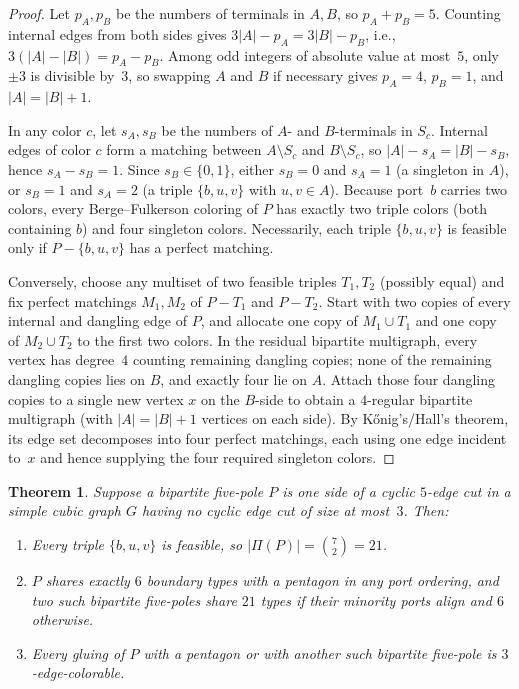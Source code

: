 \documentclass[11pt]{article}
\newtheorem{theorem}{Theorem}
\theoremstyle{remark}
\begin{document}
\begin{proof}
Let $p_A, p_B$ be the numbers of terminals in $A, B$, so $p_A + p_B = 5$. Counting
internal edges from both sides gives $3|A| - p_A = 3|B| - p_B$, i.e.,
$3(|A| - |B|) = p_A - p_B$. Among odd integers of absolute value at most~$5$, only
$\pm 3$ is divisible by~$3$, so swapping $A$ and $B$ if necessary gives $p_A = 4$,
$p_B = 1$, and $|A| = |B| + 1$.

In any color $c$, let $s_A, s_B$ be the numbers of $A$- and $B$-terminals in $S_c$.
Internal edges of color $c$ form a matching between $A \setminus S_c$ and
$B \setminus S_c$, so $|A| - s_A = |B| - s_B$, hence $s_A - s_B = 1$. Since
$s_B \in \{0,1\}$, either $s_B = 0$ and $s_A = 1$ (a singleton in $A$), or $s_B = 1$ and
$s_A = 2$ (a triple $\{b, u, v\}$ with $u, v \in A$). Because port~$b$ carries two
colors, every Berge--Fulkerson coloring of $P$ has exactly two triple colors (both
containing $b$) and four singleton colors. Necessarily, each triple $\{b, u, v\}$ is
feasible only if $P - \{b, u, v\}$ has a perfect matching.

Conversely, choose any multiset of two feasible triples $T_1, T_2$ (possibly equal) and
fix perfect matchings $M_1, M_2$ of $P - T_1$ and $P - T_2$. Start with two copies of
every internal and dangling edge of $P$, and allocate one copy of $M_1 \cup T_1$ and one
copy of $M_2 \cup T_2$ to the first two colors. In the residual bipartite multigraph,
every vertex has degree~$4$ counting remaining dangling copies; none of the remaining
dangling copies lies on $B$, and exactly four lie on $A$. Attach those four dangling
copies to a single new vertex $x$ on the $B$-side to obtain a $4$-regular bipartite
multigraph (with $|A| = |B| + 1$ vertices on each side). By K\H{o}nig's/Hall's theorem,
its edge set decomposes into four perfect matchings, each using one edge incident to~$x$
and hence supplying the four required singleton colors.
\end{proof}

\begin{theorem}\label{thm:bipartite-21}
Suppose a bipartite five-pole $P$ is one side of a cyclic $5$-edge cut in a simple cubic
graph $G$ having no cyclic edge cut of size at most~$3$. Then:
\begin{enumerate}
  \item Every triple $\{b, u, v\}$ is feasible, so $|\Pi(P)| = \binom{7}{2} = 21$.
  \item $P$ shares exactly $6$ boundary types with a pentagon in any port ordering, and
        two such bipartite five-poles share $21$ types if their minority ports align and
        $6$ otherwise.
  \item Every gluing of $P$ with a pentagon or with another such bipartite five-pole is
        $3$-edge-colorable.
\end{enumerate}
\end{theorem}
\end{document}
